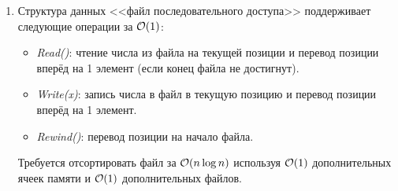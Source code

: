 \begin{enumerate}
  \item
	Структура данных <<файл последовательного доступа>>
	поддерживает следующие операции за $\mathcal{O}(1)$:
	\begin{itemize}
		\item \emph{Read()}: чтение числа из файла на текущей
		позиции и перевод позиции вперёд на 1 элемент (если конец файла не достигнут).
		\item \emph{Write(x)}: запись числа в файл в текущую
		позицию и перевод позиции вперёд на 1 элемент.
		\item \emph{Rewind()}: перевод позиции на начало файла.
	\end{itemize}

	Требуется отсортировать файл за $\mathcal{O}(n \log{n})$ используя
	$\mathcal{O}(1)$ дополнительных ячеек памяти и $\mathcal{O}(1)$ дополнительных файлов.




	
\end{enumerate}

